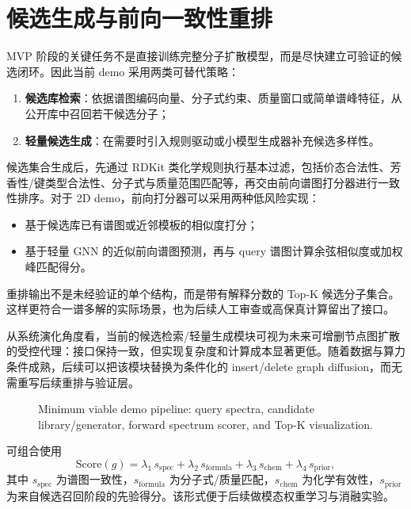\section{候选生成与前向一致性重排}
MVP 阶段的关键任务不是直接训练完整分子扩散模型，而是尽快建立可验证的候选闭环。因此当前 demo 采用两类可替代策略：
\begin{enumerate}
  \item \textbf{候选库检索}：依据谱图编码向量、分子式约束、质量窗口或简单谱峰特征，从公开库中召回若干候选分子；
  \item \textbf{轻量候选生成}：在需要时引入规则驱动或小模型生成器补充候选多样性。
\end{enumerate}

候选集合生成后，先通过 RDKit 类化学规则执行基本过滤，包括价态合法性、芳香性/键类型合法性、分子式与质量范围匹配等，再交由前向谱图打分器进行一致性排序。对于 2D demo，前向打分器可以采用两种低风险实现：
\begin{itemize}
  \item 基于候选库已有谱图或近邻模板的相似度打分；
  \item 基于轻量 GNN 的近似前向谱图预测，再与 query 谱图计算余弦相似度或加权峰匹配得分。
\end{itemize}
重排输出不是未经验证的单个结构，而是带有解释分数的 Top-K 候选分子集合。这样更符合一谱多解的实际场景，也为后续人工审查或高保真计算留出了接口。

从系统演化角度看，当前的候选检索/轻量生成模块可视为未来可增删节点图扩散的受控代理：接口保持一致，但实现复杂度和计算成本显著更低。随着数据与算力条件成熟，后续可以把该模块替换为条件化的 insert/delete graph diffusion，而无需重写后续重排与验证层。

\begin{figure}[htbp]
  \centering
  
  \caption{Minimum viable demo pipeline: query spectra, candidate library/generator, forward spectrum scorer, and Top-K visualization.}
\end{figure}

\begin{keybox}[重排评分建议]
可组合使用
\[
\mathrm{Score}(g)=\lambda_1\,s_{\mathrm{spec}}+\lambda_2\,s_{\mathrm{formula}}+\lambda_3\,s_{\mathrm{chem}}+\lambda_4\,s_{\mathrm{prior}},
\]
其中 $s_{\mathrm{spec}}$ 为谱图一致性，$s_{\mathrm{formula}}$ 为分子式/质量匹配，$s_{\mathrm{chem}}$ 为化学有效性，$s_{\mathrm{prior}}$ 为来自候选召回阶段的先验得分。该形式便于后续做模态权重学习与消融实验。
\end{keybox}
